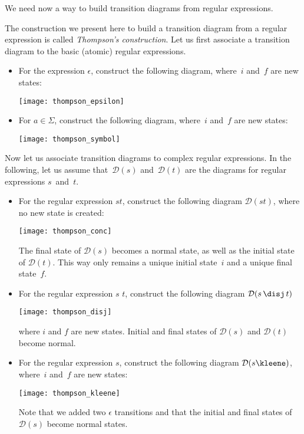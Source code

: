 \documentclass[12pt,a4paper]{article}
\begin{document}
We need now a way to build transition diagrams from regular
expressions.

The construction we present here to build a transition diagram from a
regular expression is called \emph{Thompson's construction}. Let us
first associate a transition diagram to the basic (atomic) regular
expressions.
\begin{itemize}

  \item For the expression \(\epsilon\), construct the following
    diagram, where~\(i\) and~\(f\) are new states:
  \begin{center}
    \texttt{[image: thompson\_epsilon]}
  \end{center}

  \item For \(a \in \Sigma\), construct the following diagram,
    where~\(i\) and~\(f\) are new states:
  \begin{center}
    \texttt{[image: thompson\_symbol]}
  \end{center}

\end{itemize}
Now let us associate transition diagrams to complex regular
expressions. In the following, let us assume that~\(\mathcal{D}(s)\)
and~\(\mathcal{D}(t)\) are the diagrams for regular expressions
\(s\)~and~\(t\).
\begin{itemize}

  \item For the regular expression \(st\), construct the following
    diagram \(\mathcal{D}(st)\), where no new state is created:
\begin{center}
\texttt{[image: thompson\_conc]}
\end{center}
  The final state of \(\mathcal{D}(s)\) becomes a normal state, as
  well as the initial state of \(\mathcal{D}(t)\). This way only
  remains a unique initial state~\(i\) and a unique final state~\(f\).

  \item For the regular expression \(s\) \disj \(t\), construct the
    following diagram \(\mathcal{D}(s \, \text{\disj} \, t)\)
\begin{center}
\texttt{[image: thompson\_disj]}
\end{center}
where \(i\) and \(f\) are new states. Initial and final states of
\(\mathcal{D}(s)\) and \(\mathcal{D}(t)\) become normal.

  \item For the regular expression \(s\)\kleene, construct the
    following diagram \(\mathcal{D}(s\text{\kleene})\), where~\(i\)
    and~\(f\) are new states:
\begin{center}
\texttt{[image: thompson\_kleene]}
\end{center}
Note that we added two \(\epsilon\) transitions and that the initial
and final states of \(\mathcal{D}(s)\) become normal states.

\end{itemize}
\end{document}
